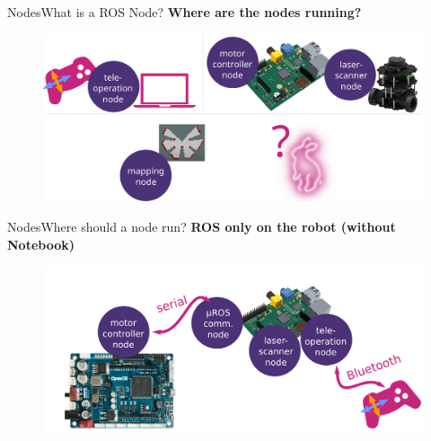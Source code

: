 \documentclass[aspectratio=169]{beamer}
\begin{document}
  \begin{frame}{Nodes}{What is a ROS Node?}
    \textbf{Where are the nodes running?}\\
      \begin{figure}[tbh!]
        \centering
        \includegraphics[width=.9\textwidth]{./figures/where_should_a_node_run.pdf}
      \end{figure}
  \end{frame}

\begin{frame}{Nodes}{Where should a node run?}
    \textbf{ROS only on the robot (without Notebook)}
      \begin{figure}[tbh!]
        \centering
        \includegraphics[width=.9\textwidth]{./figures/ros_nodes_on_robots.pdf}
      \end{figure}
  \end{frame}
  
\end{document}
